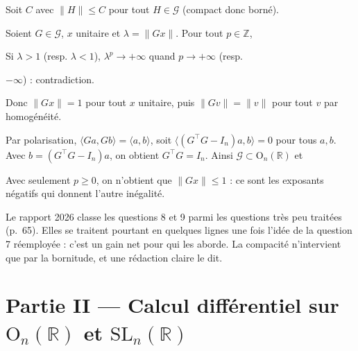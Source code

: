 \documentclass[11pt,a4paper]{article}
\newcommand{\equationajustee}[1]{%
  \sbox{\boiteequation}{$\displaystyle #1$}%
  \ifdim\wd\boiteequation>\linewidth
    \[\resizebox{\linewidth}{!}{\usebox{\boiteequation}}\]%
  \else
    \[#1\]%
  \fi}
\begin{document}
Soit \(C\) avec \(\|H\|\le C\) pour tout \(H\in\mathcal{G}\) (compact donc borné).

Soient \(G\in\mathcal{G}\), \(x\) unitaire et \(\lambda=\|Gx\|\). Pour tout \(p\in\mathbb{Z}\),

\equationajustee{\begin{aligned}\lambda^p&=\|G_px\|\\&\le\|G_p\|\le C.\end{aligned}}

Si \(\lambda>1\) (resp. \(\lambda<1\)), \(\lambda^p\to+\infty\) quand \(p\to+\infty\) (resp.

\(-\infty\)) : contradiction.

Donc \(\|Gx\|=1\) pour tout \(x\) unitaire, puis \(\|Gv\|=\|v\|\) pour tout \(v\) par homogénéité.

Par polarisation, \(\langle Ga,Gb\rangle=\langle a,b\rangle\), soit \(\langle(G^\top G-I_n)a,b\rangle=0\) pour tous \(a,b\). Avec \(b=(G^\top G-I_n)a\), on obtient \(G^\top G=I_n\). Ainsi \(\mathcal{G}\subset{\mathrm{O}}_n(\mathbb{R})\) et

\equationajustee{\boxed{\mathcal{G}={\mathrm{O}}_n(\mathbb{R}).}}

\begin{piege}

Avec seulement \(p\ge0\), on n'obtient que \(\|Gx\|\le1\) : ce sont les exposants négatifs qui donnent l'autre inégalité.

\end{piege}

\begin{jury}

Le rapport 2026 classe les questions 8 et 9 parmi les questions très peu traitées (p.~65). Elles se traitent pourtant en quelques lignes une fois l'idée de la question 7 réemployée : c'est un gain net pour qui les aborde. La compacité n'intervient que par la bornitude, et une rédaction claire le dit.

\end{jury}

\hypertarget{partie-ii-calcul-diffuxe9rentiel-sur-mathrmo_nmathbbr-et-mathrmsl_nmathbbr}{%
\section{\texorpdfstring{Partie II --- Calcul différentiel sur \({\mathrm{O}}_n(\mathbb{R})\) et \({\mathrm{SL}}_n(\mathbb{R})\)}{Partie II --- Calcul différentiel sur \{\textbackslash mathrm\{O\}\}\_n(\textbackslash mathbb\{R\}) et \{\textbackslash mathrm\{SL\}\}\_n(\textbackslash mathbb\{R\})}}\label{partie-ii-calcul-diffuxe9rentiel-sur-mathrmo_nmathbbr-et-mathrmsl_nmathbbr}}
\end{document}
